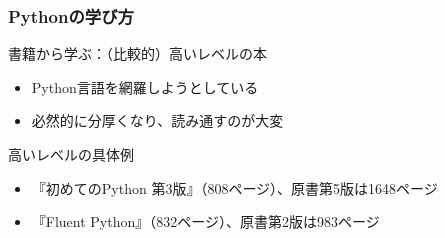 \documentclass[aspectratio=169,dvipdfmx,12pt,notheorems]{beamer}
\theoremstyle{definition}
\begin{document}
\begin{frame}\frametitle{Pythonの学び方}

\begin{block}{書籍から学ぶ：（比較的）高いレベルの本}
\begin{itemize}
\item Python言語を網羅しようとしている
\item 必然的に分厚くなり、読み通すのが大変
\end{itemize}
\end{block}

\begin{exampleblock}{高いレベルの具体例}
\begin{itemize}
\item 『初めてのPython 第3版』（808ページ）、原書第5版は1648ページ
\item 『Fluent Python』（832ページ）、原書第2版は983ページ
\end{itemize}
\end{exampleblock}

\end{frame}

%
%
%
\end{document}
